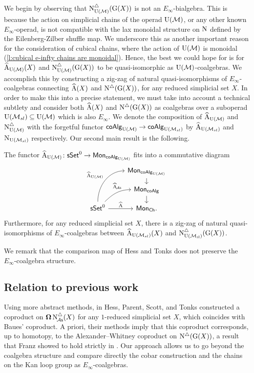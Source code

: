 We begin by observing that $\operatorname{N^{\triangle}_{{\operatorname{U}(\mathcal{M})}}}(\operatorname{G}(X))$ is not an $E_\infty$-bialgebra.
This is because the action on simplicial chains of the operad ${\operatorname{U}(\mathcal{M})}$, or any other known $E_\infty$-operad, is not compatible with the lax monoidal structure on $\operatorname{N}$ defined by the Eilenberg-Zilber shuffle map.
We underscore this as another important reason for the consideration of cubical chains, where the action of ${\operatorname{U}(\mathcal{M})}$ is monoidal (\cref{l:cubical e-infty chains are monoidal}).
Hence, the best we could hope for is for $\operatorname{\widehat{A}_{{\operatorname{U}(\mathcal{M})}}}(X)$ and $\operatorname{N^{\triangle}_{{\operatorname{U}(\mathcal{M})}}}(\operatorname{G}(X))$ to be quasi-isomorphic as ${\operatorname{U}(\mathcal{M})}$-coalgebras.
We accomplish this by constructing a zig-zag of natural quasi-isomorphisms of $E_{\infty}$-coalgebras connecting $\operatorname{\widehat{A}}(X)$ and $\operatorname{N^{\triangle}}(\operatorname{G}(X))$, for any reduced simplicial set $X$.
In order to make this into a precise statement, we must take into account a technical subtlety and consider both $\operatorname{\widehat{A}}(X)$ and $\operatorname{N^{\triangle}}(\operatorname{G}(X))$ as coalgebras over a suboperad ${\operatorname{U}(\mathcal{M}_{sl})} \subseteq {\operatorname{U}(\mathcal{M})}$ which is also $E_\infty$.
We denote the composition of $\operatorname{\widehat{A}_{{\operatorname{U}(\mathcal{M})}}}$ and $\operatorname{N^{\triangle}_{{\operatorname{U}(\mathcal{M})}}}$ with the forgetful functor $\mathsf{coAlg}_{\operatorname{U}(\mathcal{M})} \to \mathsf{coAlg}_{\operatorname{U}(\mathcal{M}_{sl})}$ by $\operatorname{\widehat{A}}_{\operatorname{U}(\mathcal{M}_{sl})}$ and $\operatorname{N}_{\operatorname{U}(\mathcal{M}_{sl})}$ respectively.
Our second main result is the following.

\begin{theorem} \label{t:2nd main thm in the intro}
	The functor $\operatorname{\widehat{A}_{{\operatorname{U}(\mathcal{M})}}} \colon \mathsf{sSet}^0 \to \mathsf{Mon}_{\mathsf{coAlg}_{\operatorname{U}(\mathcal{M})}}$ fits into a commutative diagram
	\[
	\begin{tikzcd}[row sep=small]
	& \Mon_{\coAlg_\UM} \arrow[d] \\
	& \Mon_{\coAlg} \arrow[d] \\
	\sSet^0
	\arrow[r, "\adamsE", ]
	\arrow[ru, "\adamsEA", out=45, in=180, near end]
	\arrow[ruu, "\adamsEUM", out=90, in=180]
	& \Mon_{\Ch}.
	\end{tikzcd}
	\]
	Furthermore, for any reduced simplicial set $X$, there is a zig-zag of natural quasi-isomorphisms of $E_\infty$-coalgebras between $\operatorname{\widehat{A}}_{\operatorname{U}(\mathcal{M}_{sl})}(X)$ and $\operatorname{N^{\triangle}_{{\operatorname{U}(\mathcal{M}_{sl})}}}(\operatorname{G}(X))$.
\end{theorem}

We remark that the comparison map of Hess and Tonks does not preserve the $E_\infty$-coalgebra structure.

\subsection*{Relation to previous work}

Using more abstract methods, in \cite{hess2006adamshilton} Hess, Parent, Scott, and Tonks constructed a coproduct on $\operatorname{\mathbf{\Omega}} \operatorname{N^{\triangle}_{\!{\mathcal{A}\mathsf{s}}}}(X)$ for any $1$-reduced simplicial set $X$, which coincides with Baues' coproduct.
A priori, their methods imply that this coproduct corresponds, up to homotopy, to the Alexander--Whitney coproduct on $\operatorname{N^{\triangle}}(\operatorname{G}(X))$, a result that Franz showed to hold strictly in \cite{franz2020szczarba}.
Our approach allows us to go beyond the coalgebra structure and compare directly the cobar construction and the chains on the Kan loop group as $E_{\infty}$-coalgebras.

